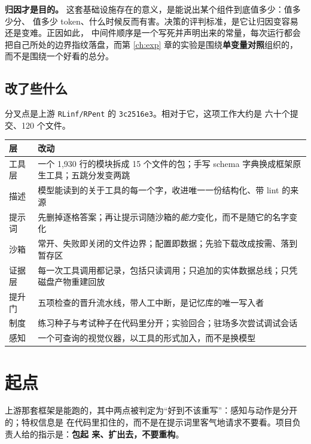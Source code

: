 \documentclass[11pt,a4paper,UTF8,fontset=macnew]{ctexrep}
\newcommand{\keyrule}[1]{\textbf{\textcolor{acc}{#1}}}
\begin{document}
\keyrule{归因才是目的。} 这套基础设施存在的意义，是能说出某个组件到底值多少：值多少分、
值多少 token、什么时候反而有害。决策的评判标准，是它让归因变容易还是变难。正因如此，
中间件顺序是一个写死并声明出来的常量，每次运行都会把自己所处的边界指纹落盘，而第 \ref{ch:exp}
章的实验是围绕\textbf{单变量对照}组织的，而不是围绕一个好看的总分。

\section{改了些什么}

分叉点是上游 \texttt{RLinf/RPent} 的 \texttt{3c2516e3}。相对于它，这项工作大约是
六十个提交、120 个文件。

\begin{table}[htbp]
\centering\small
\begin{tabularx}{\textwidth}{@{}l X@{}}
\toprule
\textbf{层} & \textbf{改动} \\
\midrule
工具层 & 一个 1{,}930 行的模块拆成 15 个文件的包；手写 schema 字典换成框架原生工具；五跳分发变两跳 \\
描述 & 模型能读到的关于工具的每一个字，收进唯一一份结构化、带 lint 的来源 \\
提示词 & 先删掉逐格答案；再让提示词随沙箱的\emph{能力}变化，而不是随它的名字变化 \\
沙箱 & 常开、失败即关闭的文件边界；配置即数据；先验下载改成按需、落到暂存区 \\
证据层 & 每一次工具调用都记录，包括只读调用；只追加的实体数据总线；只凭磁盘产物重建回放 \\
提升门 & 五项检查的晋升流水线，带人工中断，是记忆库的唯一写入者 \\
制度 & 练习种子与考试种子在代码里分开；实验回合；驻场多次尝试调试会话 \\
感知 & 一个可查询的视觉仪器，以工具的形式加入，而不是换模型 \\
\bottomrule
\end{tabularx}
\end{table}

\chapter{起点}

上游那套框架是能跑的，其中两点被判定为“好到不该重写”：感知与动作是分开的；特权信息是
在代码里扣住的，而不是在提示词里客气地请求不要看。项目负责人给的指示是：\textbf{包起
来、扩出去，不要重构}。
\end{document}
